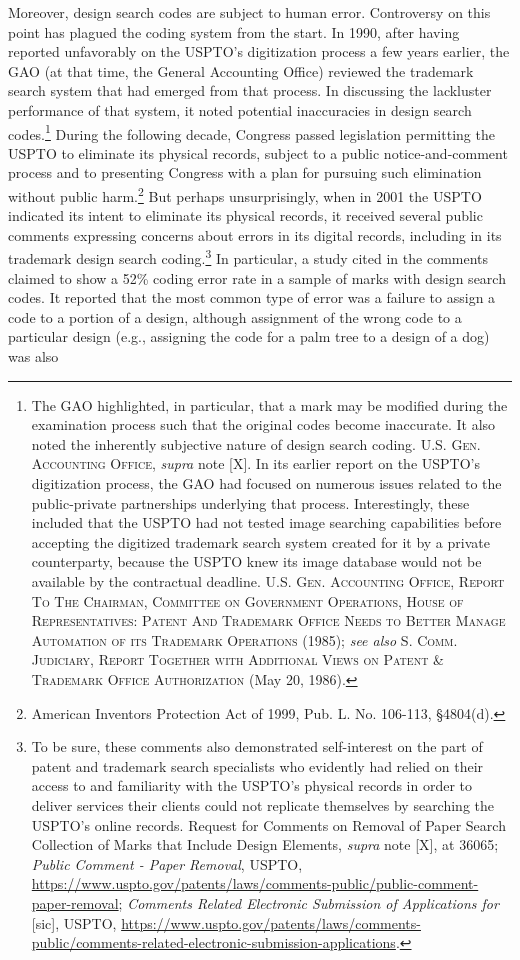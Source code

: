 \documentclass[letterpaper, 11pt, oneside]{article}
\begin{document}
Moreover, design search codes are subject to human error. Controversy on this point has plagued the coding system from the start. In 1990, after having reported unfavorably on the USPTO's digitization process a few years earlier, the GAO (at that time, the General Accounting Office) reviewed the trademark search system that had emerged from that process. In discussing the lackluster performance of that system, it noted potential inaccuracies in design search codes.\footnote{The GAO highlighted, in particular, that a mark may be modified during the examination process such that the original codes become inaccurate. It also noted the inherently subjective nature of design search coding. \textsc{U.S. Gen. Accounting Office}, \textit{supra} note [X]. In its earlier report on the USPTO's digitization process, the GAO had focused on numerous issues related to the public-private partnerships underlying that process. Interestingly, these included that the USPTO had not tested image searching capabilities before accepting the digitized trademark search system created for it by a private counterparty, because the USPTO knew its image database would not be available by the contractual deadline. \textsc{U.S. Gen. Accounting Office, Report To The Chairman, Committee on Government Operations, House of Representatives: Patent And Trademark Office Needs to Better Manage Automation of its Trademark Operations} (1985); \textit{see also} \textsc{S. Comm. Judiciary, Report Together with Additional Views on Patent \& Trademark Office Authorization} (May 20, 1986).} During the following decade, Congress passed legislation permitting the USPTO to eliminate its physical records, subject to a public notice-and-comment process and to presenting Congress with a plan for pursuing such elimination without public harm.\footnote{American Inventors Protection Act of 1999, Pub. L. No. 106-113, \S 4804(d).} But perhaps unsurprisingly, when in 2001 the USPTO indicated its intent to eliminate its physical records, it received several public comments expressing concerns about errors in its digital records, including in its trademark design search coding.\footnote{To be sure, these comments also demonstrated self-interest on the part of patent and trademark search specialists who evidently had relied on their access to and familiarity with the USPTO's physical records in order to deliver services their clients could not replicate themselves by searching the USPTO's online records. Request for Comments on Removal of Paper Search Collection of Marks that Include Design Elements, \textit{supra} note [X], at 36065; \textit{Public Comment - Paper Removal}, USPTO, \url{https://www.uspto.gov/patents/laws/comments-public/public-comment-paper-removal}; \textit{Comments Related Electronic Submission of Applications for} [sic], USPTO, \url{https://www.uspto.gov/patents/laws/comments-public/comments-related-electronic-submission-applications}.} In particular, a study cited in the comments claimed to show a 52\% coding error rate in a sample of marks with design search codes. It reported that the most common type of error was a failure to assign a code to a portion of a design, although assignment of the wrong code to a particular design (e.g., assigning the code for a palm tree to a design of a dog) was also 
\end{document}
